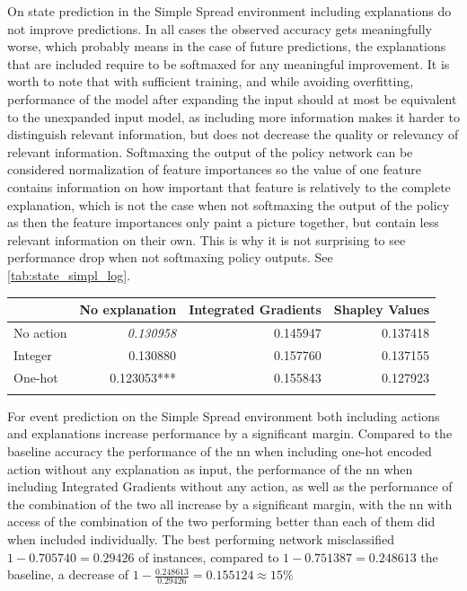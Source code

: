 \documentclass[UKenglish]{uiomasterthesis}
\begin{document}
On state prediction in the Simple Spread environment including explanations do not improve predictions. In all cases the observed accuracy gets meaningfully worse, which probably means in the case of future predictions, the explanations that are included require to be softmaxed for any meaningful improvement. It is worth to note that with sufficient training, and while avoiding overfitting, performance of the model after expanding the input should at most be equivalent to the unexpanded input model, as including more information makes it harder to distinguish relevant information, but does not decrease the quality or relevancy of relevant information. Softmaxing the output of the policy network can be considered normalization of feature importances so the value of one feature contains information on how important that feature is relatively to the complete explanation, which is not the case when not softmaxing the output of the policy as then the feature importances only paint a picture together, but contain less relevant information on their own. This is why it is not surprising to see performance drop when not softmaxing policy outputs. See \cref{tab:state_simpl_log}.

\begin{center}
\label{tab:state_simpl_log}
\begin{tabular}{lrrr}
\toprule
 & No explanation & Integrated Gradients & Shapley Values \\
\midrule
No action & \textit{0.130958} & 0.145947 & 0.137418 \\
Integer & 0.130880 & 0.157760 & 0.137155 \\
One-hot & 0.123053*** & 0.155843 & 0.127923 \\
\bottomrule
\addlinespace[2pt]
\multicolumn{3}{l}{\textsuperscript{***}$p<0.001$, 
  \textsuperscript{**}$p<0.01$, 
  \textsuperscript{*}$p<0.05$}
\end{tabular}
\end{center}

For event prediction on the Simple Spread environment both including actions and explanations increase performance by a significant margin. Compared to the baseline accuracy the performance of the \ac{nn} when including one-hot encoded action without any explanation as input, the performance of the \ac{nn} when including Integrated Gradients without any action, as well as the performance of the combination of the two all increase by a significant margin, with the \ac{nn} with access of the combination of the two performing better than each of them did when included individually. The best performing network misclassified $1-0.705740 = 0.29426$ of instances, compared to $1-0.751387 = 0.248613$ the baseline, a decrease of $1-\frac{0.248613}{0.29426} = 0.155124 \approx 15\%$
\end{document}
